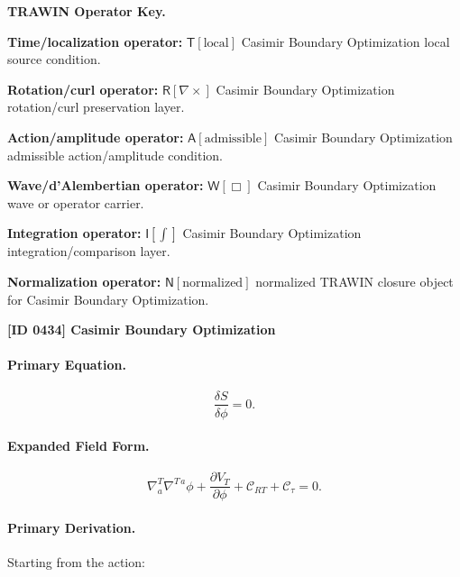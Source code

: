 \par\vspace{0.45\baselineskip}
\noindent\begin{minipage}[t]{\linewidth}
\begingroup
\small
\raggedright
\textbf{TRAWIN Operator Key.}\par
\noindent\textbf{Time/localization operator:} $\mathsf{T}\!\left[\mathrm{local}\right]$ Casimir Boundary Optimization local source condition.\par
\noindent\textbf{Rotation/curl operator:} $\mathsf{R}\!\left[\nabla\times\right]$ Casimir Boundary Optimization rotation/curl preservation layer.\par
\noindent\textbf{Action/amplitude operator:} $\mathsf{A}\!\left[\mathrm{admissible}\right]$ Casimir Boundary Optimization admissible action/amplitude condition.\par
\noindent\textbf{Wave/d'Alembertian operator:} $\mathsf{W}\!\left[\Box\right]$ Casimir Boundary Optimization wave or operator carrier.\par
\noindent\textbf{Integration operator:} $\mathsf{I}\!\left[\int\right]$ Casimir Boundary Optimization integration/comparison layer.\par
\noindent\textbf{Normalization operator:} $\mathsf{N}\!\left[\mathrm{normalized}\right]$ normalized TRAWIN closure object for Casimir Boundary Optimization.\par
\endgroup
\end{minipage}

\clearpage
\noindent\textbf{[ID 0434] Casimir Boundary Optimization}\par
\vspace{0.35em}
\paragraph{Primary Equation.}
\begin{equation}
\frac{\delta S}{\delta \phi}=0 .
\end{equation}

\paragraph{Expanded Field Form.}
\begin{equation}
\nabla^T_a\nabla^{T\,a}\phi
+
\frac{\partial V_T}{\partial \phi}
+
\mathcal{C}_{RT}
+
\mathcal{C}_{\tau}
=
0 .
\end{equation}

\paragraph{Primary Derivation.}
Starting from the action:

